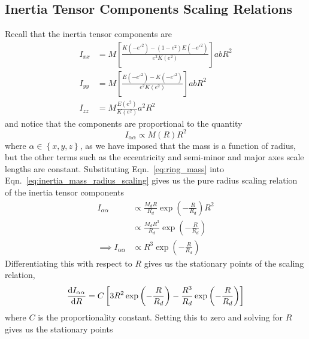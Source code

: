 \subsection{Inertia Tensor Components Scaling Relations}
Recall that the inertia tensor components are
\begin{align*}
    I_{xx} & = M
    \left[
        \frac{K\left(-{e'}^{2}\right) -\left(1 - e^2\right)E\left(-{e'}^{2}\right)}{e^2K\left(e^2\right)}
        \right]
    ab R^2                                                           \\
    I_{yy} & = M
    \left[
        \frac{E\left(-{e'}^{2}\right) - K\left(-{e'}^{2}\right)}{e^2K\left(e^2\right)}
        \right]
    ab R^2                                                           \\
    I_{zz} & = M \frac{E\left(e^2\right)}{K\left(e^2\right)} a^2 R^2
\end{align*}
and notice that the components are proportional to the quantity
\begin{equation}
    I_{\alpha\alpha} \propto M(R)R^2 \label{eq:inertia_mass_radius_scaling}
\end{equation}
where \( \alpha \in \left\{ x, y, z \right\} \), as we have imposed that the mass is a function of radius, but the %
other terms such as the eccentricity and semi-minor and major axes scale lengths are constant. Substituting
Eqn.~\ref{eq:ring_mass} into Eqn.~\ref{eq:inertia_mass_radius_scaling} gives us the pure radius scaling relation of the inertia
tensor components
\begin{align}
    I_{\alpha\alpha}          & \propto \frac{M_{d}R}{R_d} \exp\left(-\frac{R}{R_d}\right) R^2 \nonumber      \\
                              & \propto \frac{M_{d}R^3}{R_d} \exp\left(-\frac{R}{R_d}\right) \nonumber        \\
    \implies I_{\alpha\alpha} & \propto R^3 \exp\left(-\frac{R}{R_d}\right) \label{eq:inertia_radius_scaling}
\end{align}
Differentiating this with respect to \( R \) gives us the stationary points of the scaling relation,
\begin{equation}
    \frac{\textrm{d} I_{\alpha\alpha}}{\textrm{d} R}= C\left[3R^2 \exp\left(-\frac{R}{R_d}\right) - \frac{R^3}{R_d} \exp\left(-\frac{R}{R_d}\right)\right]
\end{equation}
where \( C \) is the proportionality constant. Setting this to zero and solving for \( R \) gives us the stationary points
